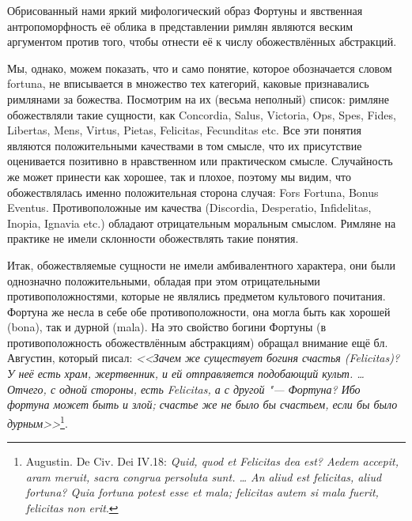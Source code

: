 Обрисованный нами яркий мифологический образ Фортуны и явственная антропоморфность её облика в представлении римлян являются веским аргументом против того, чтобы отнести её к числу обожествлённых абстракций.

Мы, однако, можем показать, что и само понятие, которое обозначается словом fortuna, не вписывается в множество тех категорий, каковые признавались римлянами за божества. Посмотрим на их (весьма неполный) список: римляне обожествляли такие сущности, как Concordia, Salus, Victoria, Ops, Spes, Fides, Libertas, Mens, Virtus, Pietas, Felicitas, Fecunditas etc. Все эти понятия являются положительными качествами в том смысле, что их присутствие оценивается позитивно в нравственном или практическом смысле. Случайность же может принести как хорошее, так и плохое, поэтому мы видим, что обожествлялась именно положительная сторона случая: Fors Fortuna, Bonus Eventus. Противоположные им качества (Discordia, Desperatio, Infidelitas, Inopia, Ignavia etc.) обладают отрицательным моральным смыслом. Римляне на практике не имели склонности обожествлять такие понятия. 

Итак, обожествляемые сущности не имели амбивалентного характера, они были однозначно положительными, обладая при этом отрицательными противоположностями, которые не являлись предметом культового почитания. Фортуна же несла в себе обе противоположности, она могла быть как хорошей (bona), так и дурной (mala). На это свойство богини Фортуны (в противоположность обожествлённым абстракциям) обращал внимание ещё бл. Августин, который писал: \textit{<<Зачем же существует богиня счастья (Felicitas)? У неё есть храм, жертвенник, и ей отправляется подобающий культ. \ldots{} Отчего, с одной стороны, есть Felicitas, а с другой "--- Фортуна? Ибо фортуна может быть и злой; счастье же не было бы счастьем, если бы было дурным>>}\footnote{Augustin. De Civ. Dei IV.18: \textit{Quid, quod et Felicitas dea est? Aedem accepit, aram meruit, sacra congrua persoluta sunt. \ldots{} An aliud est felicitas, aliud fortuna? Quia fortuna potest esse et mala; felicitas autem si mala fuerit, felicitas non erit}.}.


